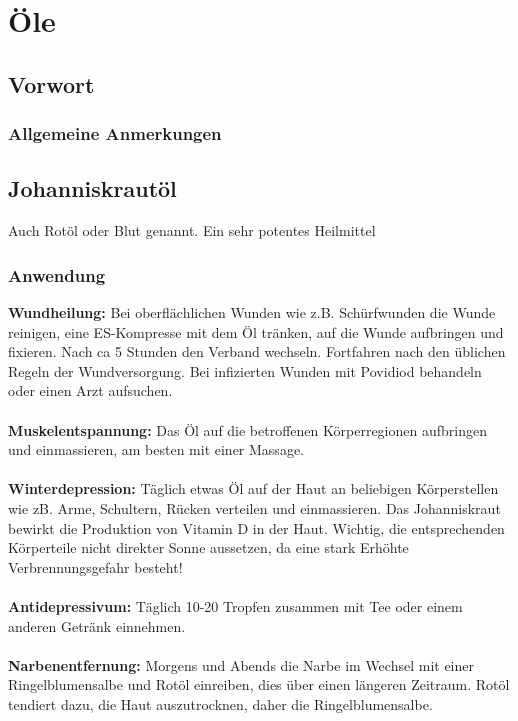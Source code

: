 \chapter{Öle}

\section{Vorwort}

\lipsum[1-5]
\newpage





\subsection{Allgemeine Anmerkungen}





\section{Johanniskrautöl}

Auch Rotöl oder Blut genannt. Ein sehr potentes Heilmittel

\subsection{Anwendung}

\textbf{Wundheilung:} Bei oberflächlichen Wunden wie z.B. Schürfwunden die Wunde reinigen, eine ES-Kompresse mit dem Öl tränken, auf die Wunde aufbringen und fixieren. Nach ca 5 Stunden den Verband wechseln. Fortfahren nach den üblichen Regeln der Wundversorgung. Bei infizierten Wunden mit Povidiod behandeln oder einen Arzt aufsuchen.\\ \\
\textbf{Muskelentspannung:} Das Öl auf die betroffenen Körperregionen aufbringen und einmassieren, am besten mit einer Massage. \\ \\
\textbf{Winterdepression:} Täglich etwas Öl auf der Haut an beliebigen Körperstellen wie zB. Arme, Schultern, Rücken verteilen und einmassieren. Das Johanniskraut bewirkt die Produktion von Vitamin D in der Haut. Wichtig, die entsprechenden Körperteile nicht direkter Sonne aussetzen, da eine stark Erhöhte Verbrennungsgefahr besteht! \\ \\
\textbf{Antidepressivum:} Täglich 10-20 Tropfen zusammen mit Tee oder einem anderen Getränk einnehmen. \\ \\
\textbf{Narbenentfernung:} Morgens und Abends die Narbe im Wechsel mit einer Ringelblumensalbe und Rotöl einreiben, dies über einen längeren Zeitraum. Rotöl tendiert dazu, die Haut auszutrocknen, daher die Ringelblumensalbe.

